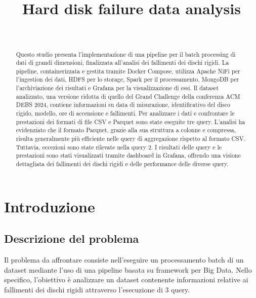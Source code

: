 \documentclass[conference]{IEEEtran}
\begin{document}
\title{Hard disk failure data analysis\\}

\author{
\and
{}
\\
}


\maketitle
\thispagestyle{plain}
\pagestyle{plain}

\begin{abstract}
    Questo studio presenta l'implementazione di una pipeline per il batch processing di dati di grandi dimensioni, finalizzata all'analisi dei fallimenti dei dischi rigidi. La pipeline, containerizzata e gestita tramite Docker Compose, utilizza Apache NiFi per l'ingestion dei dati, HDFS per lo storage, Spark per il processamento, MongoDB per l'archiviazione dei risultati e Grafana per la visualizzazione di essi. Il dataset analizzato, una versione ridotta di quello del Grand Challenge della conferenza ACM DEBS 2024, contiene informazioni su data di misurazione, identificativo del disco rigido, modello, ore di accensione e fallimenti. Per analizzare i dati e confrontare le prestazioni dei formati di file CSV e Parquet sono state eseguite tre query. L'analisi ha evidenziato che il formato Parquet, grazie alla sua struttura a colonne e compressa, risulta generalmente più efficiente nelle query di aggregazione rispetto al formato CSV. Tuttavia, eccezioni sono state rilevate nella query 2. I risultati delle query e le prestazioni sono stati visualizzati tramite dashboard in Grafana, offrendo una visione dettagliata dei fallimenti dei dischi rigidi e delle performance delle diverse query.
\end{abstract}

\section{Introduzione}
\subsection{Descrizione del problema}
Il problema da affrontare consiste nell'eseguire un processamento batch di un dataset mediante l'uso di una pipeline basata su framework per Big Data. Nello specifico, l'obiettivo è analizzare un dataset contenente informazioni relative ai fallimenti dei dischi rigidi attraverso l'esecuzione di 3 query.
\end{document}
